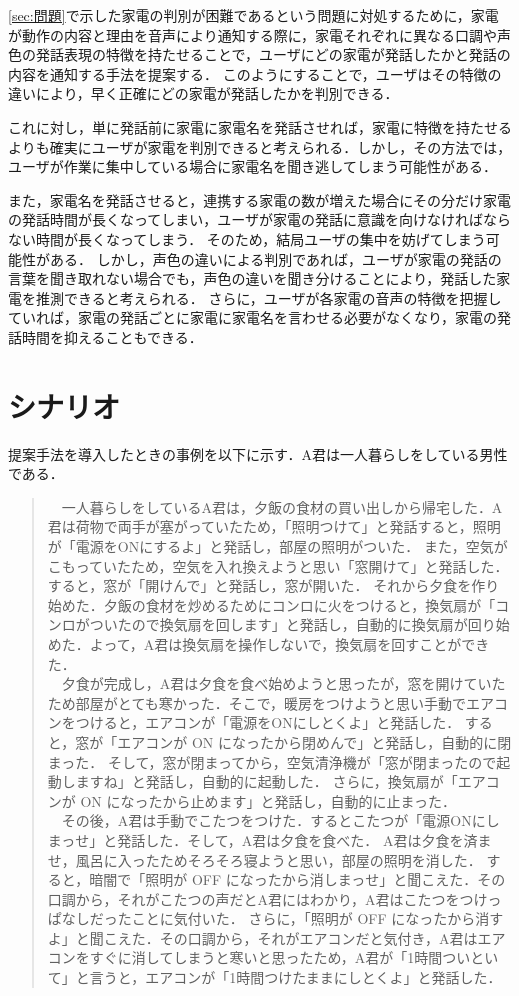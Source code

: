 \documentclass[a4j,12pt,twoside]{jreport}
\begin{document}
\ref{sec:問題}で示した家電の判別が困難であるという問題に対処するために，家電が動作の内容と理由を音声により通知する際に，家電それぞれに異なる口調や声色の発話表現の特徴を持たせることで，ユーザにどの家電が発話したかと発話の内容を通知する手法を提案する．
このようにすることで，ユーザはその特徴の違いにより，早く正確にどの家電が発話したかを判別できる．

これに対し，単に発話前に家電に家電名を発話させれば，家電に特徴を持たせるよりも確実にユーザが家電を判別できると考えられる．しかし，その方法では，ユーザが作業に集中している場合に家電名を聞き逃してしまう可能性がある．

また，家電名を発話させると，連携する家電の数が増えた場合にその分だけ家電の発話時間が長くなってしまい，ユーザが家電の発話に意識を向けなければならない時間が長くなってしまう．
そのため，結局ユーザの集中を妨げてしまう可能性がある．
しかし，声色の違いによる判別であれば，ユーザが家電の発話の言葉を聞き取れない場合でも，声色の違いを聞き分けることにより，発話した家電を推測できると考えられる．
さらに，ユーザが各家電の音声の特徴を把握していれば，家電の発話ごとに家電に家電名を言わせる必要がなくなり，家電の発話時間を抑えることもできる．
\section{シナリオ}
提案手法を導入したときの事例を以下に示す．A君は一人暮らしをしている男性である．
\begin{quote}

　一人暮らしをしているA君は，夕飯の食材の買い出しから帰宅した．A君は荷物で両手が塞がっていたため，「照明つけて」と発話すると，照明が「電源をONにするよ」と発話し，部屋の照明がついた．
また，空気がこもっていたため，空気を入れ換えようと思い「窓開けて」と発話した．すると，窓が「開けんで」と発話し，窓が開いた．
それから夕食を作り始めた．夕飯の食材を炒めるためにコンロに火をつけると，換気扇が「コンロがついたので換気扇を回します」と発話し，自動的に換気扇が回り始めた．よって，A君は換気扇を操作しないで，換気扇を回すことができた．\\
　夕食が完成し，A君は夕食を食べ始めようと思ったが，窓を開けていたため部屋がとても寒かった．そこで，暖房をつけようと思い手動でエアコンをつけると，エアコンが「電源をONにしとくよ」と発話した．
すると，窓が「エアコンが ON になったから閉めんで」と発話し，自動的に閉まった．
そして，窓が閉まってから，空気清浄機が「窓が閉まったので起動しますね」と発話し，自動的に起動した．
さらに，換気扇が「エアコンが ON になったから止めます」と発話し，自動的に止まった．\\
　その後，A君は手動でこたつをつけた．するとこたつが「電源ONにしまっせ」と発話した．そして，A君は夕食を食べた．
A君は夕食を済ませ，風呂に入ったためそろそろ寝ようと思い，部屋の照明を消した．
すると，暗闇で「照明が OFF になったから消しまっせ」と聞こえた．その口調から，それがこたつの声だとA君にはわかり，A君はこたつをつけっぱなしだったことに気付いた．
さらに，「照明が OFF になったから消すよ」と聞こえた．その口調から，それがエアコンだと気付き，A君はエアコンをすぐに消してしまうと寒いと思ったため，A君が「1時間ついといて」と言うと，エアコンが「1時間つけたままにしとくよ」と発話した．

\end{quote}
\end{document}
